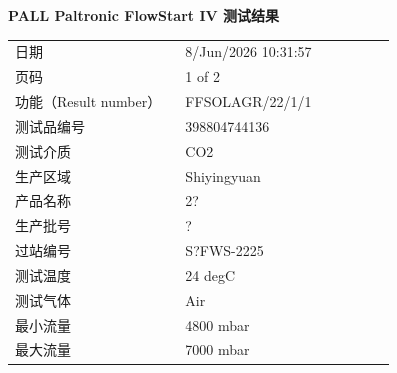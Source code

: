 \documentclass[UTF8,10pt,a4paper,fontset=fandol]{ctexart}
\newcommand{\fieldvalue}[1]{#1}
\begin{document}
\begin{minipage}[t]{0.47\linewidth}
\textbf{PALL \quad Paltronic FlowStart IV 测试结果}

\begin{tabular}{@{}p{0.42\linewidth}p{0.52\linewidth}@{}}
日期 &
\fieldvalue{8/Jun/2026 10:31:57} \\

页码 &
\fieldvalue{1 of 2} \\

功能（Result number） &
\fieldvalue{FFSOLAGR/22/1/1} \\

测试品编号 &
\fieldvalue{398804744136} \\

测试介质 &
\fieldvalue{CO2} \\

生产区域 &
\fieldvalue{Shiyingyuan} \\

产品名称 &
\fieldvalue{2?} \\

生产批号 &
\fieldvalue{?} \\

过站编号 &
\fieldvalue{S?FWS-2225} \\

测试温度 &
\fieldvalue{24 degC} \\

测试气体 &
\fieldvalue{Air} \\

最小流量 &
\fieldvalue{4800 mbar} \\

最大流量 &
\fieldvalue{7000 mbar}
\end{tabular}


\end{minipage}
\end{document}
